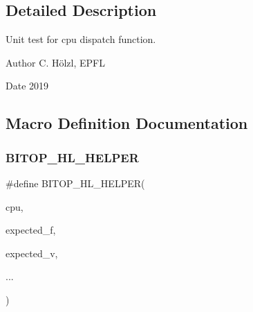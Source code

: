 \subsection{Detailed Description}
Unit test for cpu dispatch function. 

\begin{DoxyAuthor}{Author}
C. Hölzl, E\+P\+FL 
\end{DoxyAuthor}
\begin{DoxyDate}{Date}
2019 
\end{DoxyDate}


\subsection{Macro Definition Documentation}
\mbox{\label{unit-test-cpu-dispatch_8c_a24d1365b42b4caf2fc88e4c9e724c7ab}} 
\subsubsection{\texorpdfstring{B\+I\+T\+O\+P\+\_\+\+H\+L\+\_\+\+H\+E\+L\+P\+ER}{BITOP\_HL\_HELPER}}
{\footnotesize\ttfamily \#define B\+I\+T\+O\+P\+\_\+\+H\+L\+\_\+\+H\+E\+L\+P\+ER(\begin{DoxyParamCaption}\item[{}]{cpu,  }\item[{}]{expected\+\_\+f,  }\item[{}]{expected\+\_\+v,  }\item[{}]{... }\end{DoxyParamCaption})}

